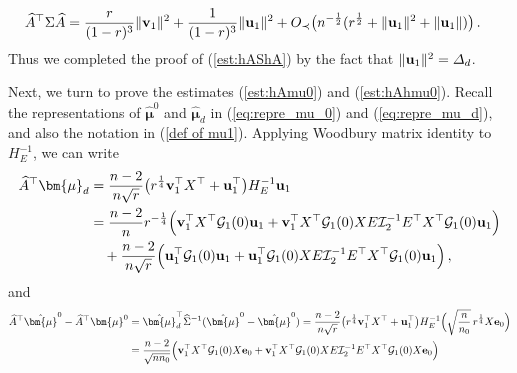 \documentclass[12pt]{article}
\numberwithin{equation}{section}
\theoremstyle{remark}
\newcommand{\1}{{\rm 1}\kern-0.24em{\rm I}}
\begin{document}
\begin{appendices}
\begin{align*}%
\widehat A^{\top} \Sigma \widehat A 
&=  \frac{r}{(1-r)^3}\Vert {\bf v}_1\Vert^2 + \frac{1}{(1-r)^3} \Vert {\bf u}_1\Vert^2 +  O_\prec \big(n^{-\frac 12}(r^{\frac 12} + \Vert {\bf u}_1\Vert^2 + \Vert {\bf u}_1\Vert )  \big)\,.
\end{align*}
Thus we completed the proof of  (\ref{est:hAShA}) by the fact that $\Vert {\bf u}_1\Vert^2 = \varDelta_d$.




Next, we turn to prove the estimates (\ref{est:hAmu0}) and (\ref{est:hAhmu0}). 
Recall the  representations of $\hat {\bm{\mu}}^0$ and $\hat {\bm{\mu}}_d$ in (\ref{eq:repre_mu_0}) and  (\ref{eq:repre_mu_d}), and also the notation in (\ref{def of mu1}). Applying Woodbury matrix identity to $H_E^{-1}$, we can write
\begin{align*}
\widehat{A} ^{\top} {\bm{\mu}}_d &=  \frac{n-2}{n\sqrt r} \big( r^{\frac 14}{\bf v}_1^{\top} {X}^{\top} + {\bf u}_1^{\top}\big) H_E^{-1} {\bf u}_1  \notag\\
& =\frac{n-2}{n} r^{-\frac 14} \Big( {\bf v}_1^{\top} {X}^{\top} \mathcal{G}_1(0) {\bf u}_1+ {\bf v}_1^{\top} {X}^{\top} \mathcal{G}_1(0){X}{E} \mathcal{I}_2^{-1}{E}^{\top} {X}^{\top} \mathcal{G}_1(0) {\bf u}_1\Big)\notag\\
&\quad  +   \frac{n-2}{n\sqrt r} \Big( {\bf u}_1^{\top} \mathcal{G}_1(0)  {\bf u}_1 + {\bf u}_1^{\top}  \mathcal{G}_1(0){X}{E} \mathcal{I}_2^{-1}{E}^{\top} {X}^{\top} \mathcal{G}_1(0){\bf u}_1 \Big)\,, 
\end{align*}
and 
\begin{align*}
\widehat{A} ^{\top} \hat{\bm{\mu}}^0 - \widehat{A} ^{\top} {\bm{\mu}}^0 &= \hat {\bm{\mu}}_d^{\top} \widehat \Sigma^{-1}(\hat{\bm{\mu}}^0 -  \hat{\bm{\mu}}^0)  = \frac{n-2}{n\sqrt r} \big( r^{\frac 14}{\bf v}_1^{\top} {X}^{\top} + {\bf u}_1^{\top}\big) H_E^{-1}\Big(\sqrt{\frac{n}{n_0}} \, r^{\frac 14}{X}{\bf e}_0\Big)\notag\\
&= \frac{n-2}{\sqrt{nn_0}}  \Big( {\bf v}_1^{\top} {X}^{\top} \mathcal{G}_1(0)  {X}{\bf e}_0+ {\bf v}_1^{\top} {X}^{\top} \mathcal{G}_1(0){X}{E} \mathcal{I}_2^{-1}{E}^{\top} {X}^{\top} \mathcal{G}_1(0) {X}{\bf e}_0\Big)\notag\\

\end{align*}
\end{appendices}
\end{document}

